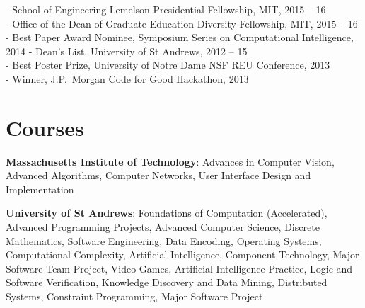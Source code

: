 \documentclass[line,margin]{cv}
\begin{document}
\begin{resume}
- School of Engineering Lemelson Presidential Fellowship, MIT, 2015 -- 16\\
- Office of the Dean of Graduate Education Diversity Fellowship, MIT, 2015 -- 16\\
- Best Paper Award Nominee, Symposium Series on Computational Intelligence, 2014
- Dean's List, University of St Andrews, 2012 -- 15\\
- Best Poster Prize, University of Notre Dame NSF REU Conference, 2013\\
- Winner, J.P.\ Morgan Code for Good Hackathon, 2013


\section{Courses}

\textbf{Massachusetts Institute of Technology}:
Advances in Computer Vision, Advanced Algorithms, Computer Networks,
User Interface Design and Implementation

\textbf{University of St Andrews}:
Foundations of Computation (Accelerated), Advanced Programming Projects,
Advanced Computer Science, Discrete Mathematics, Software Engineering,
Data Encoding, Operating Systems, Computational Complexity,
Artificial Intelligence, Component Technology, Major Software Team Project,
Video Games, Artificial Intelligence Practice, Logic and Software Verification,
Knowledge Discovery and Data Mining, Distributed Systems, Constraint Programming,
Major Software Project

\end{resume}
\end{document}
